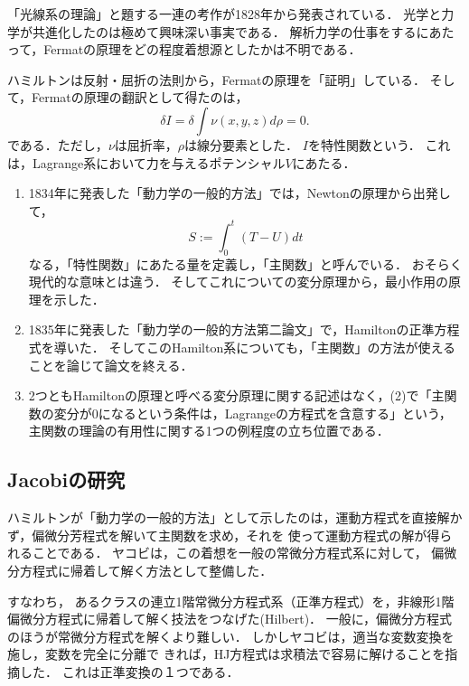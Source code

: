 \documentclass[uplatex, dvipdfmx]{jsreport}
\begin{document}
\begin{history}[Hamiltonの光学研究]
    「光線系の理論」と題する一連の考作が1828年から発表されている．
    光学と力学が共進化したのは極めて興味深い事実である．
    解析力学の仕事をするにあたって，Fermatの原理をどの程度着想源としたかは不明である．

    ハミルトンは反射・屈折の法則から，Fermatの原理を「証明」している．
    そして，Fermatの原理の翻訳として得たのは，
    \[\delta I=\delta\int\nu(x,y,z)d\rho=0.\]
    である．ただし，$\nu$は屈折率，$\rho$は線分要素とした．
    $I$を特性関数という．
    これは，Lagrange系において力を与えるポテンシャル$V$にあたる．
\end{history}

\begin{history}[力学への応用]\mbox{}
    \begin{enumerate}
        \item 1834年に発表した「動力学の一般的方法」\cite{Hamilton34}では，Newtonの原理から出発して，
        \[S:=\int^t_0(T-U)dt\]
        なる，「特性関数」にあたる量を定義し，「主関数」と呼んでいる．
        おそらく現代的な意味とは違う．
        そしてこれについての変分原理から，最小作用の原理を示した．
        \item 1835年に発表した「動力学の一般的方法第二論文」\cite{Hamilton35}で，Hamiltonの正準方程式を導いた．
        そしてこのHamilton系についても，「主関数」の方法が使えることを論じて論文を終える．
        \item 2つともHamiltonの原理と呼べる変分原理に関する記述はなく，(2)で「主関数の変分が$0$になるという条件は，Lagrangeの方程式を含意する」という，主関数の理論の有用性に関する1つの例程度の立ち位置である．
    \end{enumerate}
\end{history}

\subsection{Jacobiの研究}

\begin{tcolorbox}[colframe=ForestGreen, colback=ForestGreen!10!white,breakable,colbacktitle=ForestGreen!40!white,coltitle=black,fonttitle=\bfseries\sffamily,
title=]
    ハミルトンが「動力学の一般的方法」として示したのは，運動方程式を直接解かず，偏微分芳程式を解いて主関数を求め，それを
    使って運動方程式の解が得られることである．
    ヤコビは，この着想を一般の常微分方程式系に対して，
    偏微分方程式に帰着して解く方法として整備した．
    
    すなわち，
    あるクラスの連立1階常微分方程式系（正準方程式）を，非線形1階偏微分方程式に帰着して解く技法をつなげた(Hilbert\cite{Hilbert37})．
    一般に，偏微分方程式のほうが常微分方程式を解くより難しい．
    しかしヤコビは，適当な変数変換を施し，変数を完全に分離で
    きれば，HJ方程式は求積法で容易に解けることを指摘した．
    これは正準変換の１つである．
\end{tcolorbox}
\end{document}
